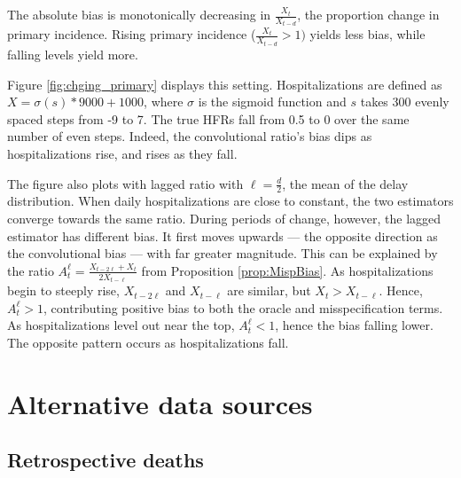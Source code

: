\documentclass{article}
\begin{document}
The absolute bias is monotonically decreasing in $\frac{X_{t}}{X_{t-d}}$, the proportion change in primary incidence. Rising primary incidence ($\frac{X_{t}}{X_{t-d}}>1)$ yields less bias, while falling levels yield more.

Figure \ref{fig:chging_primary} displays this setting. Hospitalizations are defined as $X = \sigma(s)*9000+1000$, where $\sigma$ is the sigmoid function and $s$ takes 300 evenly spaced steps from -9 to 7. The true HFRs fall from 0.5 to 0 over the same number of even steps. Indeed, the convolutional ratio's bias dips as hospitalizations rise, and rises as they fall. 

The figure also plots with lagged ratio with $\ell=\frac{d}{2}$, the mean of the delay distribution. When daily hospitalizations are close to constant, the two estimators converge towards the same ratio. During periods of change, however, the lagged estimator has different bias. It first moves upwards --- the opposite direction as the convolutional bias --- with far greater magnitude. This can be explained by the ratio $A_t^\ell = \frac{X_{t-2\ell}+X_t}{2X_{t-\ell}}$ from Proposition \ref{prop:MispBias}. As hospitalizations begin to steeply rise, $X_{t-2\ell}$ and $X_{t-\ell}$ are similar, but $X_t > X_{t-\ell}$. Hence, $A_t^\ell>1$, contributing positive bias to both the oracle and misspecification terms. As hospitalizations level out near the top, $A_t^\ell < 1$, hence the bias falling lower. The opposite pattern occurs as hospitalizations fall. 


\section{Alternative data sources}
\label{apx:alternatives}

\subsection{Retrospective deaths}
\label{apx:NCHS_deaths}
\end{document}
